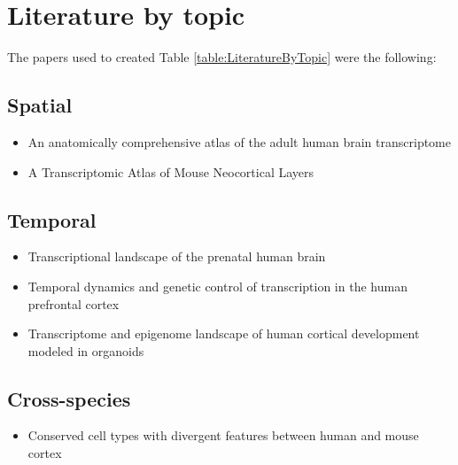 \section{Literature by topic}\label{LiteratureAppendix}

The papers used to created Table \ref{table:LiteratureByTopic} were the following:

\subsection{Spatial}
\begin{itemize}
    \item An anatomically comprehensive atlas of the adult human brain transcriptome \cite{hawrylycz_anatomically_2012}
    \item A Transcriptomic Atlas of Mouse Neocortical Layers \cite{belgard_transcriptomic_2011}
\end{itemize}

\subsection{Temporal}
\begin{itemize}
    \item Transcriptional landscape of the prenatal human brain \cite{miller_transcriptional_2014}
    \item Temporal dynamics and genetic control of transcription in the human prefrontal cortex \cite{colantuoni_temporal_2011}
    \item Transcriptome and epigenome landscape of human cortical development modeled in organoids \cite{amiri_transcriptome_2018}
\end{itemize}

\subsection{Cross-species}
\begin{itemize}
    \item Conserved cell types with divergent features between human and mouse cortex \cite{hodge_conserved_2018}
\end{itemize}


